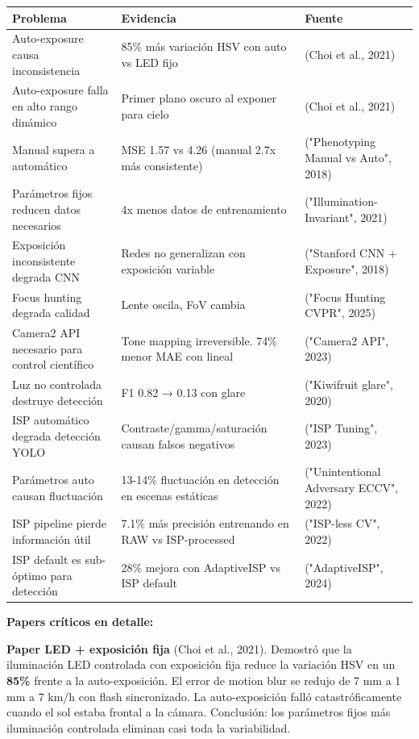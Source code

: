 \begin{tabular}{lll}
\hline
Problema & Evidencia & Fuente \\
\hline
Auto-exposure causa inconsistencia & 85\% más variación HSV con auto vs LED fijo & (Choi et al., 2021) \\
Auto-exposure falla en alto rango dinámico & Primer plano oscuro al exponer para cielo & (Choi et al., 2021) \\
Manual supera a automático & MSE 1.57 vs 4.26 (manual 2.7x más consistente) & ("Phenotyping Manual vs Auto", 2018) \\
Parámetros fijos reducen datos necesarios & 4x menos datos de entrenamiento & ("Illumination-Invariant", 2021) \\
Exposición inconsistente degrada CNN & Redes no generalizan con exposición variable & ("Stanford CNN + Exposure", 2018) \\
Focus hunting degrada calidad & Lente oscila, FoV cambia & ("Focus Hunting CVPR", 2025) \\
Camera2 API necesario para control científico & Tone mapping irreversible. 74\% menor MAE con lineal & ("Camera2 API", 2023) \\
Luz no controlada destruye detección & F1 0.82 → 0.13 con glare & ("Kiwifruit glare", 2020) \\
ISP automático degrada detección YOLO & Contraste/gamma/saturación causan falsos negativos & ("ISP Tuning", 2023) \\
Parámetros auto causan fluctuación & 13-14\% fluctuación en detección en escenas estáticas & ("Unintentional Adversary ECCV", 2022) \\
ISP pipeline pierde información útil & 7.1\% más precisión entrenando en RAW vs ISP-processed & ("ISP-less CV", 2022) \\
ISP default es sub-óptimo para detección & 28\% mejora con AdaptiveISP vs ISP default & ("AdaptiveISP", 2024) \\
\hline
\end{tabular}


\textbf{Papers críticos en detalle:}


\textbf{Paper LED + exposición fija} (Choi et al., 2021). Demostró que la iluminación LED controlada con exposición fija reduce la variación HSV en un \textbf{85\%} frente a la auto-exposición. El error de motion blur se redujo de 7 mm a 1 mm a 7 km/h con flash sincronizado. La auto-exposición falló catastróficamente cuando el sol estaba frontal a la cámara. Conclusión: los parámetros fijos más iluminación controlada eliminan casi toda la variabilidad.


